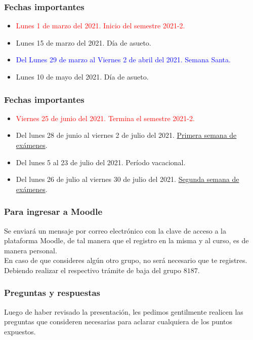 \begin{frame}
\frametitle{Fechas importantes}
\fontsize{12}{12}\selectfont
\begin{itemize}
\item \textcolor{red}{Lunes 1 de marzo del 2021. Inicio del semestre 2021-2.}
\item Lunes 15 de marzo del 2021. Día de asueto.
\item \textcolor{blue}{Del Lunes 29 de marzo al Viernes 2 de abril del 2021. Semana Santa.}
\item Lunes 10 de mayo del 2021. Día de asueto.
\end{itemize}
\end{frame}
\begin{frame}
\frametitle{Fechas importantes}
\fontsize{12}{12}\selectfont
\begin{itemize}
\item \textcolor{red}{Viernes 25 de junio del 2021. Termina el semestre 2021-2.}
\item Del lunes 28 de junio al viernes 2 de julio del 2021. \underline{Primera semana de exámenes}.
\item Del lunes 5 al 23 de julio del 2021. Período vacacional.
\item Del lunes 26 de julio al viernes 30 de julio del 2021. \underline{Segunda semana de exámenes}.
\end{itemize}
\end{frame}
\begin{frame}
\frametitle{Para ingresar a Moodle}
Se enviará un mensaje por correo electrónico con la clave de acceso a la plataforma Moodle, de tal manera que el registro en la misma y al curso, es de manera personal.
\\
\bigskip
En caso de que consideres algún otro grupo, no será necesario que te registres. Debiendo realizar el respectivo trámite de baja del grupo $8187$.
\end{frame}
\begin{frame}
\frametitle{Preguntas y respuestas}
Luego de haber revisado la presentación, les pedimos gentilmente realicen las preguntas que consideren necesarias para aclarar cualquiera de los puntos expuestos.
\end{frame}
